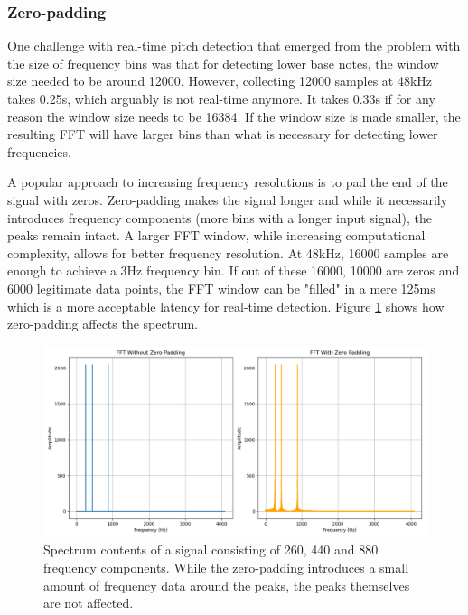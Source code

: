 \subsubsection{Zero-padding}
One challenge with real-time pitch detection that emerged from the problem with the size of frequency bins was that for detecting lower base notes, the window size needed to be around 12000. However, collecting 12000 samples at 48kHz takes 0.25s, which arguably is not real-time anymore. It takes 0.33s if for any reason the window size needs to be 16384. If the window size is made smaller, the resulting FFT will have larger bins than what is necessary for detecting lower frequencies. 

A popular approach to increasing frequency resolutions is to pad the end of the signal with zeros. Zero-padding makes the signal longer and while it necessarily introduces frequency components (more bins with a longer input signal), the peaks remain intact. A larger FFT window, while increasing computational complexity, allows for better frequency resolution. At 48kHz, 16000 samples are enough to achieve a 3Hz frequency bin. If out of these 16000, 10000 are zeros and 6000 legitimate data points, the FFT window can be "filled" in a mere 125ms which is a more acceptable latency for real-time detection. Figure \ref{fig:zeropadSpectrum} shows how zero-padding affects the spectrum.

\begin{figure}[ht]
    \centering
    \includegraphics[width=\textwidth]{./images/zero_pad_spectrum.png}
    \caption{Spectrum contents of a signal consisting of 260, 440 and 880 frequency components. While the zero-padding introduces a small amount of frequency data around the peaks, the peaks themselves are not affected. \label{fig:zeropadSpectrum}}
\end{figure}


